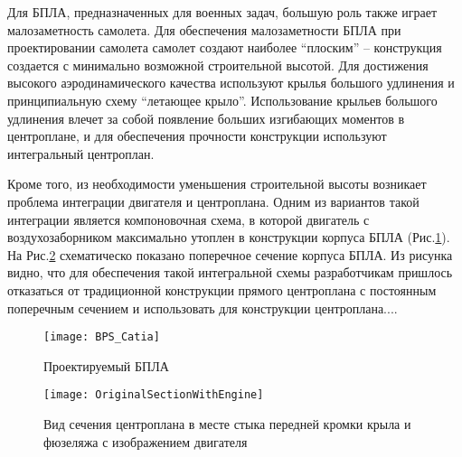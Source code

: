 


Для БПЛА, предназначенных для военных задач, большую роль также играет малозаметность самолета. Для обеспечения малозаметности БПЛА при проектировании самолета самолет создают наиболее ``плоским'' -- конструкция создается с минимально возможной строительной высотой. Для достижения высокого аэродинамического качества используют крылья большого удлинения и принципиальную схему ``летающее крыло''. Использование крыльев большого удлинения влечет за собой появление больших изгибающих моментов в центроплане, и для обеспечения прочности конструкции используют интегральный центроплан. 


Кроме того, из необходимости уменьшения строительной высоты возникает проблема интеграции двигателя и центроплана. Одним из вариантов такой интеграции является компоновочная схема, в которой двигатель с воздухозаборником максимально утоплен в конструкции корпуса БПЛА (Рис.\ref{fig:BPS}). На Рис.\ref{fig:OriginalSectionWithEngine} схематическо показано поперечное сечение корпуса БПЛА. Из рисунка видно, что для обеспечения такой интегральной схемы разработчикам пришлось отказаться от традиционной конструкции прямого центроплана с постоянным поперечным сечением и использовать для конструкции центроплана....



\begin{figure}[ht]
\centering
\texttt{[image: BPS\_Catia]}
\caption{Проектируемый БПЛА}
\label{fig:BPS}
\end{figure}




\begin{figure}[ht]
\captionsetup{justification=centering}
\centering
\texttt{[image: OriginalSectionWithEngine]}
\caption{Вид сечения центроплана в месте стыка передней кромки крыла и фюзеляжа с изображением двигателя}
\label{fig:OriginalSectionWithEngine}
\end{figure}


